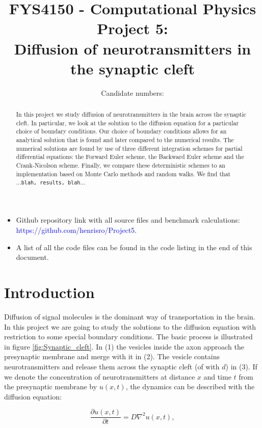 \documentclass[a4paper, 11pt, notitlepage,english]{article}
\author{Candidate numbers:}
\title{FYS4150 - Computational Physics \\
      Project 5: \\
       Diffusion of neurotransmitters in the synaptic cleft}
\begin{document}
\maketitle

\begin{abstract}
In this project we study diffusion of neurotransmitters in the brain across the synaptic cleft. In particular, we look at the solution to the diffusion equation for a particular choice of boundary conditions. Our choice of boundary conditions allows for an analytical solution that is found and later compared to the numerical results. The numerical solutions are found by use of three different integration schemes for partial differential equations: the Forward Euler scheme, the Backward Euler scheme and the Crank-Nicolson scheme. Finally, we compare these deterministic schemes to an implementation based on Monte Carlo methods and random walks. We find that ...\texttt{blah, results, blah}... \\
\end{abstract}

\begin{itemize}
\item Github repository link with all source files and benchmark calculations: \\
 \textcolor{blue}{https://github.com/henrisro/Project5}.
\item A list of all the code files can be found in the code listing in the end of this document.
\end{itemize}

\section{Introduction}

Diffusion of signal molecules is the dominant way of transportation in the brain. In this project we are going to study the solutions to the diffusion equation with restriction to some special boundary conditions. The basic process is illustrated in figure \ref{fig:Synaptic_cleft}. In (1) the vesicles inside the axon approach the presynaptic membrane and merge with it in (2). The vesicle contains neurotransmitters and release them across the synaptic cleft (of with $d$) in (3). If we denote the concentration of neurotransmitters at distance $x$ and time $t$ from the presynaptic membrane by $u(x,t)$, the dynamics can be described with the diffusion equation:

\begin{equation}
\frac{\partial u(x,t)}{\partial t} = D \nabla^2 u(x,t),
\label{eq:Diffusion_eq}
\end{equation}
\end{document}
